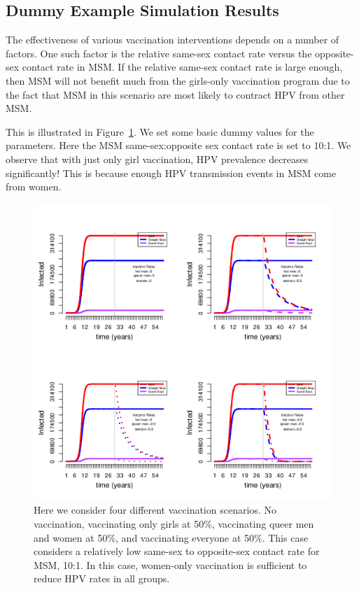 \documentclass[12pt]{article}
\begin{document}

\subsection*{Dummy Example Simulation Results}

The effectiveness of various vaccination interventions depends on a number of factors.  One such factor is the relative same-sex contact rate versus the opposite-sex contact rate in MSM.  If the relative same-sex contact rate is large enough, then MSM will not benefit much from the girls-only vaccination program due to the fact that MSM in this scenario are most likely to contract HPV from other MSM.  

This is illustrated in Figure~\ref{fig:example1}.  We set some basic dummy values for the parameters.  Here the MSM same-sex:opposite sex contact rate is set to 10:1.  We observe that with just only girl vaccination, HPV prevalence decreases significantly!  This is because enough HPV transmission events in MSM come from women.  

\begin{figure}[h!]
\includegraphics[width=\linewidth]{exampleFig/example1.png}
\caption{Here we consider four different vaccination scenarios.  No vaccination, vaccinating only girls at 50\%, vaccinating queer men and women at 50\%, and vaccinating everyone at 50\%.  This case considers a relatively low same-sex to opposite-sex contact rate for MSM, 10:1.  In this case, women-only vaccination is sufficient to reduce HPV rates in all groups.}
\label{fig:example1}
\end{figure}
\end{document}

